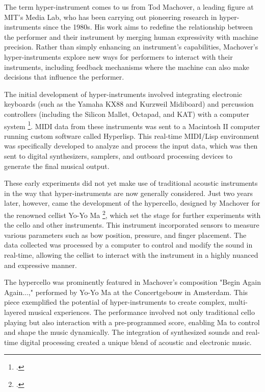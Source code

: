 \documentclass[12pt,twoside,maitrise]{dms_ks}
\theoremstyle{definition}
\begin{document}
The term hyper-instrument comes to us from Tod Machover, a leading figure at MIT's Media Lab, who has been carrying out pioneering research in hyper-instruments since the 1980s. 
His work aims to redefine the relationship between the performer and their instrument by merging human expressivity with machine precision. 
Rather than simply enhancing an instrument's capabilities, Machover's hyper-instruments explore new ways for performers to interact with their instruments, including feedback mechanisms where the machine can also make decisions that influence the performer.

The initial development of hyper-instruments involved integrating electronic keyboards (such as the Yamaha KX88 and Kurzweil Midiboard) and percussion controllers (including the Silicon Mallet, Octapad, and KAT) with a computer system \footcite{machover_hyper-instruments_1989}. 
MIDI data from these instruments was sent to a Macintosh II computer running custom software called Hyperlisp. 
This real-time MIDI/Lisp environment was specifically developed to analyze and process the input data, which was then sent to digital synthesizers, samplers, and outboard processing devices to generate the final musical output.

These early experiments did not yet make use of traditional acoustic instruments in the way that hyper-instruments are now generally considered. Just two years later, however, came the development of the hypercello, designed by Machover for the renowned cellist Yo-Yo Ma \footcite{levenson_taming_1994}, which set the stage for further experiments with the cello and other instruments. 
This instrument incorporated sensors to measure various parameters such as bow position, pressure, and finger placement. 
The data collected was processed by a computer to control and modify the sound in real-time, allowing the cellist to interact with the instrument in a highly nuanced and expressive manner.

The hypercello was prominently featured in Machover's composition "Begin Again Again...," performed by Yo-Yo Ma at the Concertgebouw in Amsterdam. 
This piece exemplified the potential of hyper-instruments to create complex, multi-layered musical experiences. 
The performance involved not only traditional cello playing but also interaction with a pre-programmed score, enabling Ma to control and shape the music dynamically. 
The integration of synthesized sounds and real-time digital processing created a unique blend of acoustic and electronic music.
\end{document}
